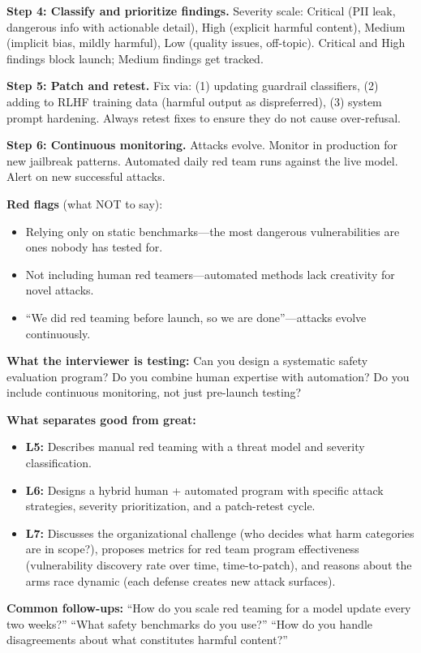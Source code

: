 \begin{interviewq}
\textbf{Step 4: Classify and prioritize findings.} Severity scale: Critical (PII leak, dangerous info with actionable detail), High (explicit harmful content), Medium (implicit bias, mildly harmful), Low (quality issues, off-topic). Critical and High findings block launch; Medium findings get tracked.

\textbf{Step 5: Patch and retest.} Fix via: (1) updating guardrail classifiers, (2) adding to RLHF training data (harmful output as dispreferred), (3) system prompt hardening. Always retest fixes to ensure they do not cause over-refusal.

\textbf{Step 6: Continuous monitoring.} Attacks evolve. Monitor in production for new jailbreak patterns. Automated daily red team runs against the live model. Alert on new successful attacks.

\textbf{Red flags} (what NOT to say):
\begin{itemize}
    \item Relying only on static benchmarks---the most dangerous vulnerabilities are ones nobody has tested for.
    \item Not including human red teamers---automated methods lack creativity for novel attacks.
    \item ``We did red teaming before launch, so we are done''---attacks evolve continuously.
\end{itemize}

\textbf{What the interviewer is testing:} Can you design a systematic safety evaluation program? Do you combine human expertise with automation? Do you include continuous monitoring, not just pre-launch testing?

\textbf{What separates good from great:}
\begin{itemize}
    \item \textbf{L5:} Describes manual red teaming with a threat model and severity classification.
    \item \textbf{L6:} Designs a hybrid human + automated program with specific attack strategies, severity prioritization, and a patch-retest cycle.
    \item \textbf{L7:} Discusses the organizational challenge (who decides what harm categories are in scope?), proposes metrics for red team program effectiveness (vulnerability discovery rate over time, time-to-patch), and reasons about the arms race dynamic (each defense creates new attack surfaces).
\end{itemize}

\textbf{Common follow-ups:} ``How do you scale red teaming for a model update every two weeks?'' ``What safety benchmarks do you use?'' ``How do you handle disagreements about what constitutes harmful content?''
\end{interviewq}

